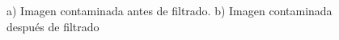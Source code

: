 \documentclass[10pt,letterpaper]{article}
\begin{document}
\begin{figure}[H]
      \begin{center}
        \caption{a) Imagen contaminada antes de filtrado. b) Imagen contaminada después de filtrado}
        \label{tif1629}
      \end{center}
    \end{figure}
\end{document}
